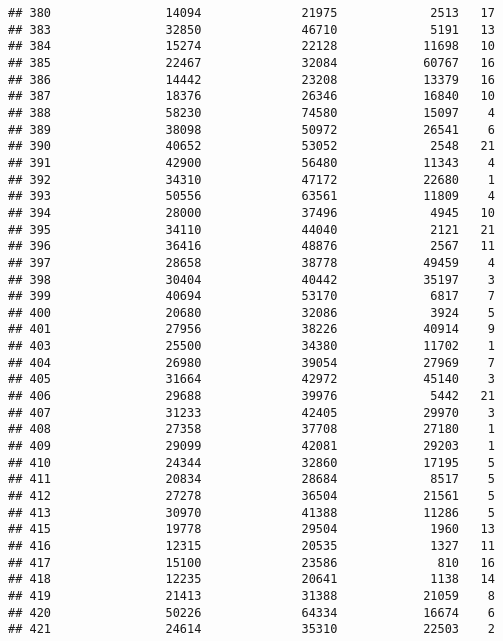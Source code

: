\documentclass[
]{article}
\begin{document}
\begin{verbatim}
## 380                14094              21975             2513   17
## 383                32850              46710             5191   13
## 384                15274              22128            11698   10
## 385                22467              32084            60767   16
## 386                14442              23208            13379   16
## 387                18376              26346            16840   10
## 388                58230              74580            15097    4
## 389                38098              50972            26541    6
## 390                40652              53052             2548   21
## 391                42900              56480            11343    4
## 392                34310              47172            22680    1
## 393                50556              63561            11809    4
## 394                28000              37496             4945   10
## 395                34110              44040             2121   21
## 396                36416              48876             2567   11
## 397                28658              38778            49459    4
## 398                30404              40442            35197    3
## 399                40694              53170             6817    7
## 400                20680              32086             3924    5
## 401                27956              38226            40914    9
## 403                25500              34380            11702    1
## 404                26980              39054            27969    7
## 405                31664              42972            45140    3
## 406                29688              39976             5442   21
## 407                31233              42405            29970    3
## 408                27358              37708            27180    1
## 409                29099              42081            29203    1
## 410                24344              32860            17195    5
## 411                20834              28684             8517    5
## 412                27278              36504            21561    5
## 413                30970              41388            11286    5
## 415                19778              29504             1960   13
## 416                12315              20535             1327   11
## 417                15100              23586              810   16
## 418                12235              20641             1138   14
## 419                21413              31388            21059    8
## 420                50226              64334            16674    6
## 421                24614              35310            22503    2

\end{verbatim}
\end{document}
